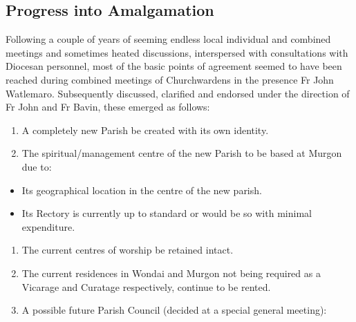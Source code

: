 \subsection{Progress into Amalgamation}



Following a couple of years of seeming endless local individual and combined meetings and sometimes heated discussions, interspersed with consultations with Diocesan personnel, most of the basic points of agreement seemed to have been reached during combined meetings of Churchwardens in the presence Fr John Watlemaro. Subsequently discussed, clarified and endorsed under the direction of Fr John and Fr Bavin, these emerged as follows:



\begin{enumerate}

\def\labelenumi{\arabic{enumi}.}

\item

  A completely new Parish be created with its own identity.

\item

  The spiritual/management centre of the new Parish to be based at Murgon due to:

\end{enumerate}



\begin{itemize}

\item

  Its geographical location in the centre of the new parish.

\item

  Its Rectory is currently up to standard or would be so with minimal expenditure.

\end{itemize}



\begin{enumerate}

\def\labelenumi{\arabic{enumi}.}

\setcounter{enumi}{2}

\item

  The current centres of worship be retained intact.

\item

  The current residences in Wondai and Murgon not being required as a Vicarage and Curatage respectively, continue to be rented.

\item

  A possible future Parish Council (decided at a special general meeting):

\end{enumerate}



